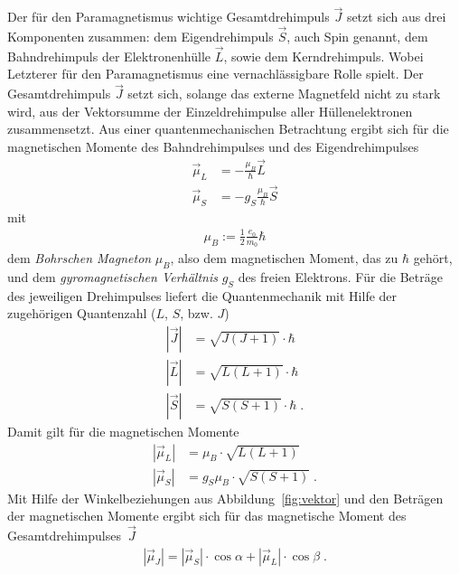 Der für den Paramagnetismus wichtige Gesamtdrehimpuls $\vec J$ setzt sich aus drei Komponenten zusammen: dem Eigendrehimpuls $\vec S$, auch Spin genannt, dem Bahndrehimpuls der Elektronenhülle $\vec L$, sowie dem Kerndrehimpuls. Wobei Letzterer für den Paramagnetismus eine vernachlässigbare Rolle spielt. Der Gesamtdrehimpuls $\vec J$ setzt sich, solange das externe Magnetfeld nicht zu stark wird, aus der Vektorsumme der Einzeldrehimpulse aller Hüllenelektronen zusammensetzt.
Aus einer quantenmechanischen Betrachtung ergibt sich für die magnetischen Momente des Bahndrehimpulses und des Eigendrehimpulses
\begin{align}
  \label{equ:mu}
  \vec\mu_L &= - \frac{\mu_B}{\hbar} \vec L \\
  \vec \mu_S &= -g_S \frac{\mu_B}{\hbar} \vec S
\end{align}
mit
\begin{align}
  \label{equ:muB}
  \mu_B := \frac{1}{2}\frac{e_0}{m_0} \hbar
\end{align}
dem \emph{Bohrschen Magneton} $\mu_B$, also dem magnetischen Moment, das zu $\hbar$ gehört, und dem \emph{gyromagnetischen Verhältnis} $g_S$ des freien Elektrons.
Für die Beträge des jeweiligen Drehimpulses liefert die Quantenmechanik mit Hilfe der zugehörigen Quantenzahl ($L$, $S$, bzw. $J$)
\begin{align}
  \label{equ:betraege}
  |\vec J| &= \sqrt{J(J+1)} \cdot \hbar \\
  |\vec L| &= \sqrt{L(L+1)} \cdot \hbar \\
  |\vec S| &= \sqrt{S(S+1)} \cdot \hbar \; .
\end{align}
Damit gilt für die magnetischen Momente
\begin{align}
  \label{equ:mu_betraege}
  |\vec \mu_L | &= \mu_B \cdot \sqrt{L(L+1)} \\
  |\vec \mu_S | &= g_S \mu_B \cdot \sqrt{S(S+1)} \; .
\end{align}
Mit Hilfe der Winkelbeziehungen aus Abbildung~\ref{fig:vektor} und den Beträgen der magnetischen Momente ergibt sich für das magnetische Moment des Gesamtdrehimpulses~$\vec J$
\begin{align}
  \label{equ:mu_J1}
  |\vec \mu_J | = |\vec \mu_S | \cdot \cos{\alpha} + |\vec \mu_L | \cdot \cos{\beta} \; .
\end{align}

